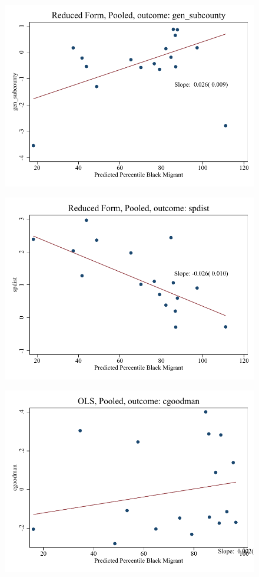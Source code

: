 \documentclass{article}
\begin{document}
\clearpage
\begin{figure}
	\centering
	\includegraphics[width=.8\textwidth]{figures/binscatter/pooled_gen_subcounty_rf_percentile.pdf}
\end{figure}
\clearpage
\begin{figure}
	\centering
	\includegraphics[width=.8\textwidth]{figures/binscatter/pooled_spdist_rf_percentile.pdf}
\end{figure}
\clearpage
\begin{figure}
	\centering
	\includegraphics[width=.8\textwidth]{figures/binscatter/pooled_cgoodman_ols_percentile.pdf}
\end{figure}
\end{document}

